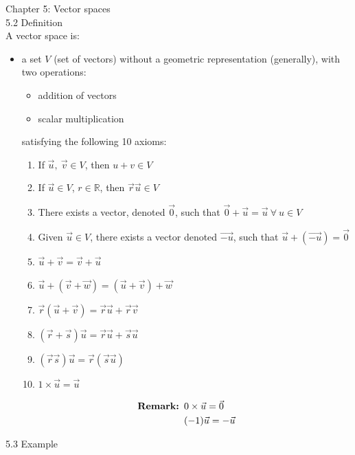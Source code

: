 \documentclass[]{article}
\begin{document}
		\pagebreak
		\noindent\Large{Chapter 5: Vector spaces}\\
		\large{5.2 Definition}\\
		\normalsize A vector space is:
		\begin{itemize}
			\item a set $V$ (set of vectors) without a geometric representation (generally), with two operations:
			\begin{itemize}
				\item addition of vectors
				\item scalar multiplication
			\end{itemize}
			satisfying the following 10 axioms:
			\begin{enumerate}
				\item If $\vec{u},~\vec{v}\in V$, then $u+v\in V$
				\item If $\vec{u}\in V$, $r\in\mathbb{R}$, then $\vec{r}\vec{u}\in V$
				\item There exists a vector, denoted $\vec{0}$, such that $\vec{0}+\vec{u}=\vec{u}~\forall~u\in V$
				\item Given $\vec{u}\in V$, there exists a vector denoted $\vec{-u}$, such that $\vec{u}+(\vec{-u})=\vec{0}$
				\item $\vec{u}+\vec{v}=\vec{v}+\vec{u}$
				\item $\vec{u}+(\vec{v}+\vec{w})=(\vec{u}+\vec{v})+\vec{w}$
				\item $\vec{r}(\vec{u}+\vec{v})=\vec{r}\vec{u}+\vec{r}\vec{v}$
				\item $(\vec{r}+\vec{s})\vec{u}=\vec{r}\vec{u}+\vec{s}\vec{u}$
				\item $(\vec{r}\vec{s})\vec{u}=\vec{r}(\vec{s}\vec{u})$
				\item $1\times\vec{u}=\vec{u}$
			\end{enumerate}
			\begin{align*}
				\text{{\bf Remark: }}&0\times\vec{u}=\vec{0}\\
				&(-1)\vec{u}=-\vec{u}
			\end{align*}
		\end{itemize}
		\large{5.3 Example}\\
		\normalsize 
\end{document}
